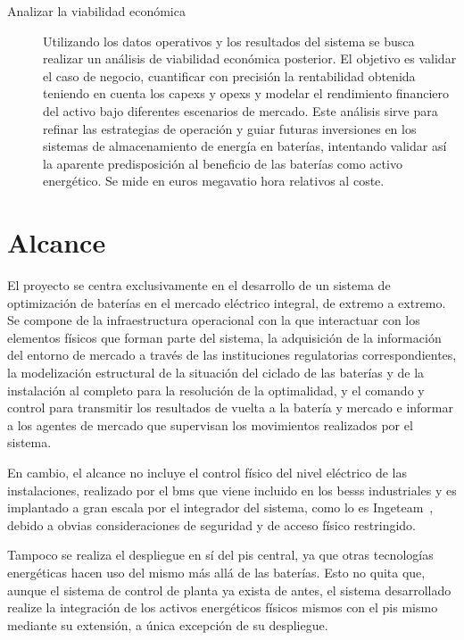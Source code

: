 \begin{description}
  \item[Analizar la viabilidad económica] Utilizando los datos operativos y los resultados del sistema se busca realizar un análisis de viabilidad económica posterior. El objetivo es validar el caso de negocio, cuantificar con precisión la rentabilidad obtenida teniendo en cuenta los \glspl{capex} y \glspl{opex} y modelar el rendimiento financiero del activo bajo diferentes escenarios de mercado. Este análisis sirve para refinar las estrategias de operación y guiar futuras inversiones en los sistemas de almacenamiento de energía en baterías, intentando validar así la aparente predisposición al beneficio de las baterías como activo energético. Se mide en euros megavatio hora relativos al coste.

\end{description}

\section{Alcance}%
\label{makereference1.2}

El proyecto se centra exclusivamente en el desarrollo de un sistema de optimización de baterías en el mercado eléctrico integral, de extremo a extremo. Se compone de la infraestructura operacional con la que interactuar con los elementos físicos que forman parte del sistema, la adquisición de la información del entorno de mercado a través de las instituciones regulatorias correspondientes, la modelización estructural de la situación del ciclado de las baterías y de la instalación al completo para la resolución de la optimalidad, y el comando y control para transmitir los resultados de vuelta a la batería y mercado e informar a los agentes de mercado que supervisan los movimientos realizados por el sistema.

En cambio, el alcance no incluye el control físico del nivel eléctrico de las instalaciones, realizado por el \gls{bms} que viene incluido en los \glspl{bess} industriales y es implantado a gran escala por el integrador del sistema, como lo es Ingeteam~\cite{ingeteam2022ingeteam}, debido a obvias consideraciones de seguridad y de acceso físico restringido.

Tampoco se realiza el despliegue en sí del \gls{pis} central, ya que otras tecnologías energéticas hacen uso del mismo más allá de las baterías. Esto no quita que, aunque el sistema de control de planta ya exista de antes, el sistema desarrollado realize la integración de los activos energéticos físicos mismos con el \gls{pis} mismo mediante su extensión, a única excepción de su despliegue.

